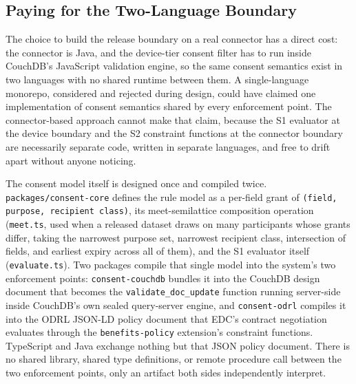 \subsection{Paying for the Two-Language Boundary}

The choice to build the release boundary on a real connector has a direct cost: the connector is Java, and the device-tier consent filter has to run inside CouchDB's JavaScript validation engine, so the same consent semantics exist in two languages with no shared runtime between them. A single-language monorepo, considered and rejected during design, could have claimed one implementation of consent semantics shared by every enforcement point. The connector-based approach cannot make that claim, because the S1 evaluator at the device boundary and the S2 constraint functions at the connector boundary are necessarily separate code, written in separate languages, and free to drift apart without anyone noticing.

The consent model itself is designed once and compiled twice. \texttt{packages/consent-core} defines the rule model as a per-field grant of \texttt{(field, purpose, recipient class)}, its meet-semilattice composition operation (\texttt{meet.ts}, used when a released dataset draws on many participants whose grants differ, taking the narrowest purpose set, narrowest recipient class, intersection of fields, and earliest expiry across all of them), and the S1 evaluator itself (\texttt{evaluate.ts}). Two packages compile that single model into the system's two enforcement points: \texttt{consent-couchdb} bundles it into the CouchDB design document that becomes the \texttt{validate\_doc\_update} function running server-side inside CouchDB's own sealed query-server engine, and \texttt{consent-odrl} compiles it into the ODRL JSON-LD policy document that EDC's contract negotiation evaluates through the \texttt{benefits-policy} extension's constraint functions. TypeScript and Java exchange nothing but that JSON policy document. There is no shared library, shared type definitions, or remote procedure call between the two enforcement points, only an artifact both sides independently interpret.

